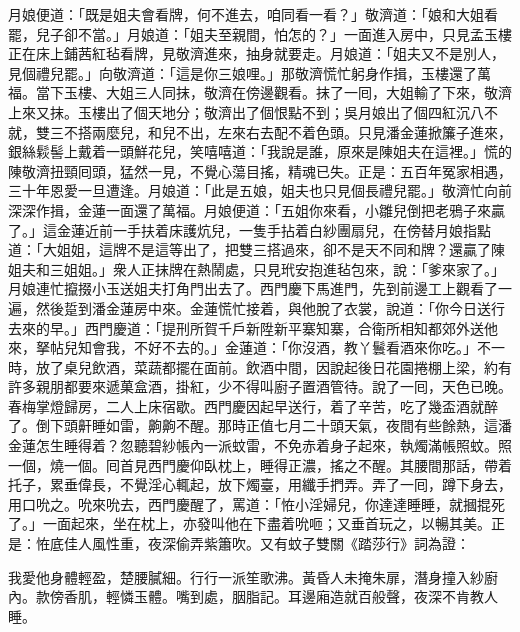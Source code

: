 月娘便道：「既是姐夫會看牌，何不進去，咱同看一看？」{}敬濟道：「娘和大姐看罷，兒子卻不當。」{}月娘道：「姐夫至親間，怕怎的？」一面進入房中，只見孟玉樓正在床上鋪茜紅毡看牌，見敬濟進來，抽身就要走。月娘道：「姐夫又不是別人，見個禮兒罷。」{}向敬濟道：「這是你三娘哩。」那敬濟慌忙躬身作揖，玉樓還了萬福。當下玉樓、大姐三人同抹，敬濟在傍邊觀看。抹了一囘，大姐輸了下來，敬濟上來又抹。玉樓出了個天地分；敬濟出了個恨點不到；吳月娘出了個四紅沉八不就，雙三不搭兩麼兒，和兒不出，左來右去配不着色頭。只見潘金蓮掀簾子進來，銀絲鬏髻上戴着一頭鮮花兒，{}笑嘻嘻道：「我說是誰，原來是陳姐夫在這裡。」{}慌的陳敬濟扭頸囘頭，猛然一見，不覺心蕩目搖，精魂已失。正是：五百年冤家相遇，三十年恩愛一旦遭逢。月娘道：「此是五娘，姐夫也只見個長禮兒罷。」敬濟忙向前深深作揖，金蓮一面還了萬福。月娘便道：「五姐你來看，小雛兒倒把老鴉子來贏了。」這金蓮近前一手扶着床護炕兒，一隻手拈着白紗團扇兒，在傍替月娘指點道：「大姐姐，這牌不是這等出了，把雙三搭過來，卻不是天不同和牌？還贏了陳姐夫和三姐姐。」衆人正抹牌在熱鬧處，只見玳安抱進毡包來，說：「爹來家了。」月娘連忙攛掇小玉送姐夫打角門出去了。{}西門慶下馬進門，先到前邊工上觀看了一遍，然後踅到潘金蓮房中來。金蓮慌忙接着，與他脫了衣裳，說道：「你今日送行去來的早。」西門慶道：「提刑所賀千戶新陞新平寨知寨，合衛所相知都郊外送他來，拏帖兒知會我，不好不去的。」金蓮道：「你沒酒，教丫鬟看酒來你吃。」不一時，放了桌兒飲酒，菜蔬都擺在面前。飲酒中間，因說起後日花園捲棚上梁，約有許多親朋都要來遞菓盒酒，掛紅，少不得叫廚子置酒管待。說了一囘，天色已晚。春梅掌燈歸房，二人上床宿歇。西門慶因起早送行，着了辛苦，吃了幾盃酒就醉了。倒下頭鼾睡如雷，齁齁不醒。那時正值七月二十頭天氣，夜間有些餘熱，這潘金蓮怎生睡得着？忽聽碧紗帳內一派蚊雷，不免赤着身子起來，執燭滿帳照蚊。照一個，燒一個。囘首見西門慶仰臥枕上，睡得正濃，搖之不醒。其腰間那話，帶着托子，累垂偉長，不覺淫心輒起，放下燭臺，用纖手捫弄。{}弄了一囘，蹲下身去，用口吮之。吮來吮去，西門慶醒了，罵道：「恠小淫婦兒，你達達睡睡，就摑掍死了。」一面起來，坐在枕上，亦發叫他在下盡着吮咂；又垂首玩之，以暢其美。正是：恠底佳人風性重，夜深偷弄紫簫吹。又有蚊子雙關《踏莎行》詞為證：

\begin{myquote}
我愛他身體輕盈，楚腰膩細。行行一派笙歌沸。黃昏人未掩朱扉，潛身撞入紗廚內。款傍香肌，輕憐玉體。嘴到處，胭脂記。耳邊廂造就百般聲，夜深不肯教人睡。
\end{myquote}

